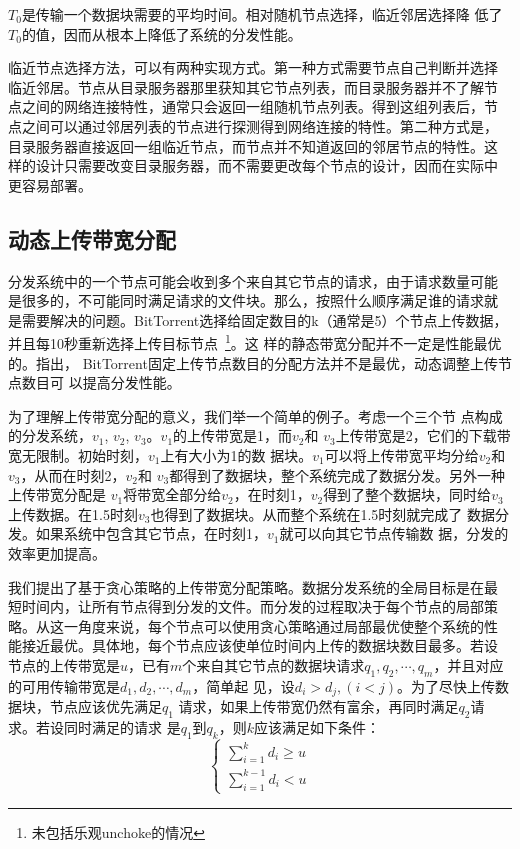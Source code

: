 $T_0$是传输一个数据块需要的平均时间。相对随机节点选择，临近邻居选择降
低了$T_0$的值，因而从根本上降低了系统的分发性能。

临近节点选择方法，可以有两种实现方式。第一种方式需要节点自己判断并选择
临近邻居。节点从目录服务器那里获知其它节点列表，而目录服务器并不了解节
点之间的网络连接特性，通常只会返回一组随机节点列表。得到这组列表后，节
点之间可以通过邻居列表的节点进行探测得到网络连接的特性。第二种方式是，
目录服务器直接返回一组临近节点，而节点并不知道返回的邻居节点的特性。这
样的设计只需要改变目录服务器，而不需要更改每个节点的设计，因而在实际中
更容易部署。

\subsection{动态上传带宽分配}


分发系统中的一个节点可能会收到多个来自其它节点的请求，由于请求数量可能
是很多的，不可能同时满足请求的文件块。那么，按照什么顺序满足谁的请求就
是需要解决的问题。BitTorrent选择给固定数目的k（通常是5）个节点上传数据，
并且每10秒重新选择上传目标节点~\footnote{未包括乐观unchoke的情况}。这
样的静态带宽分配并不一定是性能最优的。指出，
BitTorrent固定上传节点数目的分配方法并不是最优，动态调整上传节点数目可
以提高分发性能。

为了理解上传带宽分配的意义，我们举一个简单的例子。考虑一个三个节
点构成的分发系统，$v_1$, $v_2$, $v_3$。$v_1$的上传带宽是1，而$v_2$和
$v_3$上传带宽是2，它们的下载带宽无限制。初始时刻，$v_1$上有大小为1的数
据块。$v_1$可以将上传带宽平均分给$v_2$和$v_3$，从而在时刻2，$v_2$和
$v_3$都得到了数据块，整个系统完成了数据分发。另外一种上传带宽分配是
$v_1$将带宽全部分给$v_2$，在时刻1，$v_2$得到了整个数据块，同时给$v_3$
上传数据。在1.5时刻$v_3$也得到了数据块。从而整个系统在1.5时刻就完成了
数据分发。如果系统中包含其它节点，在时刻1，$v_1$就可以向其它节点传输数
据，分发的效率更加提高。

我们提出了基于贪心策略的上传带宽分配策略。数据分发系统的全局目标是在最
短时间内，让所有节点得到分发的文件。而分发的过程取决于每个节点的局部策
略。从这一角度来说，每个节点可以使用贪心策略通过局部最优使整个系统的性
能接近最优。具体地，每个节点应该使单位时间内上传的数据块数目最多。若设
节点的上传带宽是$u$，已有$m$个来自其它节点的数据块请求$q_1, q_2,
\cdots, q_m$，并且对应的可用传输带宽是$d_1, d_2, \cdots, d_m$，简单起
见，设$d_i > d_j, (i < j)$。为了尽快上传数据块，节点应该优先满足$q_1$
请求，如果上传带宽仍然有富余，再同时满足$q_2$请求。若设同时满足的请求
是$q_1$到$q_k$，则$k$应该满足如下条件：
\begin{equation}
\label{equ:bwalloc}
\left\{
\begin{array}{l}
\sum\limits_{i=1}^k d_i \ge u \\
\sum\limits_{i=1}^{k-1} d_i < u
\end{array}\right.
\end{equation}

